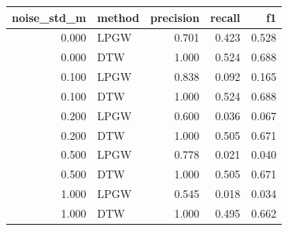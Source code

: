 \begin{tabular}{rlrrr}
\toprule
noise\_std\_m & method & precision & recall & f1 \\
\midrule
0.000 & LPGW & 0.701 & 0.423 & 0.528 \\
0.000 & DTW & 1.000 & 0.524 & 0.688 \\
0.100 & LPGW & 0.838 & 0.092 & 0.165 \\
0.100 & DTW & 1.000 & 0.524 & 0.688 \\
0.200 & LPGW & 0.600 & 0.036 & 0.067 \\
0.200 & DTW & 1.000 & 0.505 & 0.671 \\
0.500 & LPGW & 0.778 & 0.021 & 0.040 \\
0.500 & DTW & 1.000 & 0.505 & 0.671 \\
1.000 & LPGW & 0.545 & 0.018 & 0.034 \\
1.000 & DTW & 1.000 & 0.495 & 0.662 \\
\bottomrule
\end{tabular}

